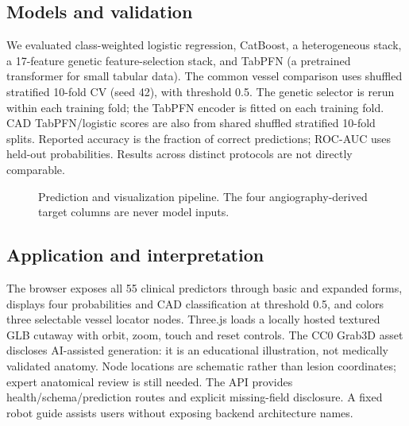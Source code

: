\documentclass[9pt,twocolumn]{article}
\begin{document}
\subsection{Models and validation}
We evaluated class-weighted logistic regression, CatBoost, a heterogeneous stack, a 17-feature genetic feature-selection stack, and TabPFN (a pretrained transformer for small tabular data). The common vessel comparison uses shuffled stratified 10-fold CV (seed 42), with threshold 0.5. The genetic selector is rerun within each training fold; the TabPFN encoder is fitted on each training fold. CAD TabPFN/logistic scores are also from shared shuffled stratified 10-fold splits. Reported accuracy is the fraction of correct predictions; ROC-AUC uses held-out probabilities. Results across distinct protocols are not directly comparable.
\begin{figure}[t]\centering
{}
\caption{Prediction and visualization pipeline. The four angiography-derived target columns are never model inputs.}
\end{figure}
\subsection{Application and interpretation}
The browser exposes all 55 clinical predictors through basic and expanded forms, displays four probabilities and CAD classification at threshold 0.5, and colors three selectable vessel locator nodes. Three.js loads a locally hosted textured GLB cutaway with orbit, zoom, touch and reset controls. The CC0 Grab3D asset discloses AI-assisted generation: it is an educational illustration, not medically validated anatomy. Node locations are schematic rather than lesion coordinates; expert anatomical review is still needed. The API provides health/schema/prediction routes and explicit missing-field disclosure. A fixed robot guide assists users without exposing backend architecture names.
\end{document}
